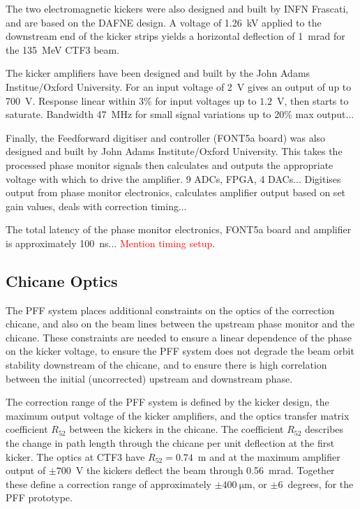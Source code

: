 \documentclass[%
 reprint,
 amsmath,amssymb,
 prl,
]{revtex4-1}
\begin{document}
The two electromagnetic kickers were also designed and built by INFN Frascati,  
and are based on the DAFNE design. A voltage of 1.26~kV applied to the 
downstream end of the kicker strips yields a horizontal deflection of 1~mrad 
for the 135~MeV CTF3 beam.

The kicker amplifiers have been designed and built by the John Adams 
Institue/Oxford University. For 
an input voltage of 2~V gives an output of up to 700~V. Response linear within 
3\% for input voltages up to \(1.2\)~V, then starts to saturate. Bandwidth 
47~MHz for small signal variations up to 20\% max output...

Finally, the Feedforward digitiser and controller (FONT5a board) was also 
designed and built by John Adams Institute/Oxford University. This takes the 
processed phase monitor signals then calculates and outputs the appropriate 
voltage with which to drive the amplifier. 9 ADCs, FPGA, 4 DACs... Digitises 
output from phase monitor electronics, calculates amplifier output based on set 
gain values, deals with correction timing...

The total latency of the phase monitor electronics, FONT5a board and amplifier 
is approximately 100~ns... \textcolor{red}{Mention timing setup}.

\subsection{\label{ss:optics}Chicane Optics}

The PFF system places additional constraints on the optics of the correction 
chicane, and also on the beam lines between the upstream phase monitor and the 
chicane. These constraints are needed to ensure a linear dependence of the 
phase on the kicker voltage, to ensure the PFF system does not degrade the beam 
orbit stability downstream of the chicane, and to ensure there is high 
correlation between the initial (uncorrected) upstream and downstream phase.

The correction range of the PFF system is defined by the kicker design, the 
maximum output voltage of the kicker amplifiers, and the optics transfer matrix 
coefficient \(R_{52}\) between the kickers in the chicane. The coefficient 
\(R_{52}\) describes the change in path length through the chicane per unit 
deflection at the first kicker. The optics at CTF3 have \(R_{52} = 0.74\)~m and 
at the maximum amplifier output 
of \(\pm700\)~V the kickers deflect the beam through 0.56~mrad. Together these 
define a correction range of approximately \(\pm400~\mathrm{\mu m}\), or 
\(\pm6\)~degrees, for the PFF 
prototype.
\end{document}
